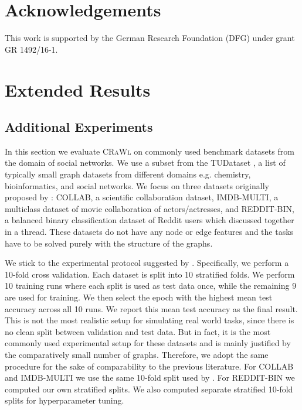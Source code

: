 \documentclass{scrartcl} \usepackage[dvipsnames]{xcolor}
\newcommand{\crawl}{\textsc{CRaWl}}
\begin{document}
\section*{Acknowledgements}
This work is supported by the German Research Foundation (DFG) under grant GR 1492/16-1.     
    
    
    
    \pagebreak
    \appendix
    \section{Extended Results}
\subsection{Additional Experiments}
\label{social_exp}

In this section we evaluate \crawl{} on commonly used benchmark datasets from the domain of social networks.
We use a subset from the \mbox{TUDataset} \citep{Morris+2020}, a list of typically small graph datasets from different domains e.g. chemistry, bioinformatics, and social networks.
We focus on three datasets originally proposed by \citet{yanardag2015deep}: COLLAB, a scientific collaboration dataset, IMDB-MULTI, a multiclass dataset of movie collaboration of actors/actresses, and REDDIT-BIN, a balanced binary classification dataset of Reddit users which discussed together in a thread.
These datasets do not have any node or edge features and the tasks have to be solved purely with the structure of the graphs. 



We stick to the experimental protocol suggested by \citet{Keyulu18}.
Specifically, we perform a 10-fold cross validation.
Each dataset is split into 10 stratified folds.
We perform 10 training runs where each split is used as test data once, while the remaining 9 are used for training.
We then select the epoch with the highest mean test accuracy across all 10 runs.
We report this mean test accuracy as the final result.
This is not the most realistic setup for simulating real world tasks, since there is no clean split between validation and test data.
But in fact, it is the most commonly used experimental setup for these datasets and is mainly justified by the comparatively small number of graphs.
Therefore, we adopt the same procedure for the sake of comparability to the previous literature.
For COLLAB and IMDB-MULTI we use the same 10-fold split used by \citet{zhang2018end}.
For REDDIT-BIN we computed our own stratified splits.
We also computed separate stratified 10-fold splits for hyperparameter tuning.
\end{document}
